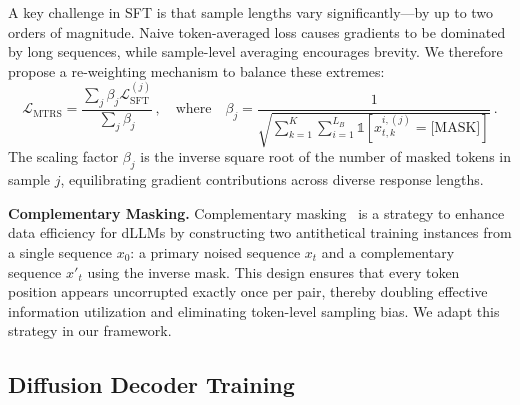 A key challenge in SFT is that sample lengths vary significantly---by up to two orders of magnitude.
Naive token-averaged loss causes gradients to be dominated by long sequences, while sample-level averaging encourages brevity.
We therefore propose a re-weighting mechanism to balance these extremes:
\begin{equation}
    \mathcal{L}_{\text{MTRS}} = \frac{\sum_{j} \beta_j \mathcal{L}_{\text{SFT}}^{(j)}}{\sum_{j} \beta_j} \,, \quad \text{where} \quad \beta_j = \frac{1}{\sqrt{\sum_{k=1}^{K} \sum_{i=1}^{L_B} \mathbb{1}[x_{t,k}^{i,(j)}=\text{[MASK]}]}} \,.
\end{equation}
The scaling factor $\beta_j$ is the inverse square root of the number of masked tokens in sample $j$, equilibrating gradient contributions across diverse response lengths.

\noindent
\textbf{Complementary Masking.}
Complementary masking~\citep{li2025lavida} is a strategy to enhance data efficiency for dLLMs by constructing two antithetical training instances from a single sequence $x_0$: a primary noised sequence $x_t$ and a complementary sequence $x'_t$ using the inverse mask.
This design ensures that every token position appears uncorrupted exactly once per pair, thereby doubling effective information utilization and eliminating token-level sampling bias.
We adapt this strategy in our framework.



\subsection{Diffusion Decoder Training}
\label{sec:decoder_training}
